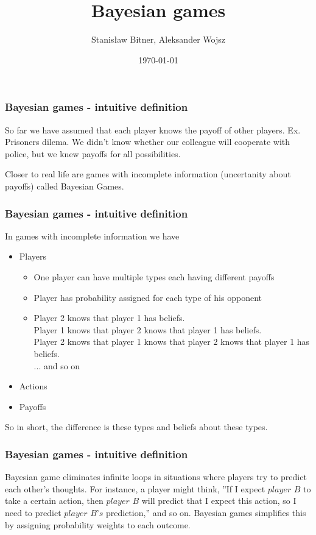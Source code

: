 \documentclass[11pt]{beamer}
\title{Bayesian games}
\author{Stanisław Bitner, Aleksander Wojsz}
\date{\today}
\begin{document}
\frame{\titlepage}



\begin{frame}
    \frametitle{Bayesian games - intuitive definition}

    So far we have assumed that each player knows the payoff of other players. 
    Ex. Prisoners dilema. We didn't know whether our colleague will cooperate with police, but we knew payoffs for all possibilities.

    \vspace{5mm}

    Closer to real life are games with incomplete information (uncertanity about payoffs) called Bayesian Games.

\end{frame} 




\begin{frame}
    \frametitle{Bayesian games - intuitive definition}

    In games with incomplete information we have
    \begin{itemize}
        \item Players
            \begin{itemize}
                \item One player can have multiple types each having different payoffs
                \item Player has probability assigned for each type of his opponent
                \item Player 2 knows that player 1 has beliefs. \\
                Player 1 knows that player 2 knows that player 1 has beliefs. \\
                Player 2 knows that player 1 knows that player 2 knows that player 1 has beliefs. \\
                ... and so on
            \end{itemize}
        \item Actions
        \item Payoffs
    \end{itemize}

    \vspace{5mm}

    So in short, the difference is these types and beliefs about these types.
\end{frame}


\begin{frame}
    \frametitle{Bayesian games - intuitive definition}

    Bayesian game eliminates infinite loops in situations where players try to predict each other's thoughts. For instance, a player might think, ''If I expect $\textit{player B}$ to take a certain action, then $\textit{player B}$ will predict that I expect this action, so I need to predict $\textit{player B's}$ prediction,'' and so on. Bayesian games simplifies this by assigning probability weights to each outcome.

\end{frame}
\end{document}
